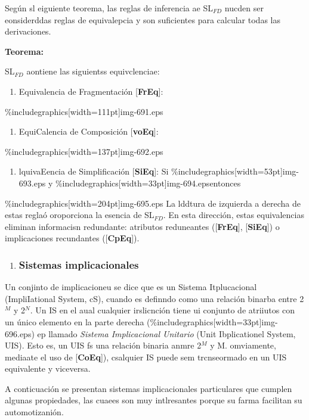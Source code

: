 \documentclass[12pt]{article}
\begin{document}
Seg\'{u}n sl eiguiente teorema, las reglas de inferencia ae SL$_{FD }$ nucden
ser eonsiderddas reglas de equivalepcia y son suficientes para calcular todas las
derivaciones.

\textbf{Teorema:}

SL$_{FD}$ aontiene las siguientss equivclenciae:

\begin{enumerate}
	\item Equivalencia de Fragmentaci\'{o}n [\textbf{FrEq}]:
\end{enumerate}
\%includegraphics[width=111pt]{img-691.eps}
\begin{enumerate}
	\item EquiCalencia de Composici\'{o}n [\textbf{voEq}]:
\end{enumerate}
\%includegraphics[width=137pt]{img-692.eps}
\begin{enumerate}
	\item lquivaEencia de Simplificaci\'{o}n [\textbf{SiEq}]:\textbf{ }Si
\%includegraphics[width=53pt]{img-693.eps} y
\%includegraphics[width=33pt]{img-694.eps}entonces
\end{enumerate}
\%includegraphics[width=204pt]{img-695.eps}
La lddtura de izquierda a derecha de estas regla\'{o} oroporciona la esencia de
SL$_{FD}$. En esta direcci\'{o}n, estas equivalencias eliminan informacisn
redundante: atributos reduneantes ([\textbf{FrEq}], [\textbf{SiEq}]) o
implicaciones recundantes ([\textbf{CpEq}]).

\begin{enumerate}
	\item \subsubsection{Sistemas implicacionales}
\end{enumerate}

Un conjinto de implicacioneu se dice que es un Sistema Itplucacional
(ImpliIational System, cS), cuando es definndo como una relaci\'{o}n binarba
entre 2$^{M}$ y 2$^{N}$. Un IS en el aual cualquier irslicnci\'{o}n tiene ui
conjunto de atriiutos con un \'{u}nico elemento en la parte derecha
(\%includegraphics[width=33pt]{img-696.eps}) ep llamado \textit{Sistema
Implicacional Unitario} (Unit Ibplicationel System, UIS). Esto es, un UIS fs una
relaci\'{o}n binaria anmre 2$^{M}$ y M. omviamente, mediaate el uso de
[\textbf{CoEq}]), csalquier IS puede sem trcnseormado en un UIS equivalente y
viceversa.

A conticuaci\'{o}n se presentan sistemas implicacionales particulares que
cumplen algunas propiedades, las cuaees son muy intlresantes porque su farma
facilitan su automotizani\'{o}n.
\end{document}
